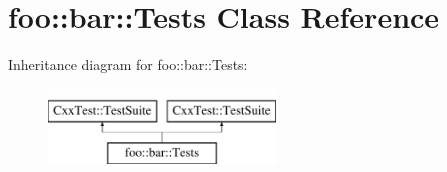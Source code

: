 \hypertarget{classfoo_1_1bar_1_1Tests}{\section{foo\-:\-:bar\-:\-:Tests Class Reference}
\label{classfoo_1_1bar_1_1Tests}
}
Inheritance diagram for foo\-:\-:bar\-:\-:Tests\-:\begin{figure}[H]
\begin{center}
\leavevmode
\includegraphics[height=2.000000cm]{classfoo_1_1bar_1_1Tests}
\end{center}
\end{figure}
